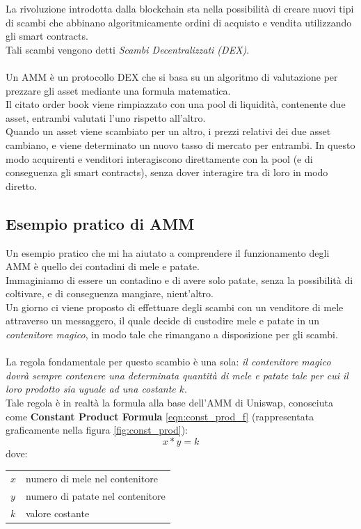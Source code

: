 \documentclass[12pt,a4paper]{report}
\makeatletter
\newenvironment{conditions}
  {\par\vspace{\abovedisplayskip}\noindent\begin{tabular}{>{$}l<{$} @{${}={}$} l}}
  {\end{tabular}\par\vspace{\belowdisplayskip}}
\makeatother
\begin{document}
La rivoluzione introdotta dalla blockchain sta nella possibilità di creare nuovi tipi di scambi che abbinano algoritmicamente ordini di acquisto e vendita utilizzando gli smart contracts.
\\Tali scambi vengono detti \textit{Scambi Decentralizzati (DEX)}.
\\\\Un AMM è un protocollo DEX che si basa su un algoritmo di valutazione per prezzare gli asset mediante una formula matematica.
\\Il citato order book viene rimpiazzato con una pool di liquidità\cite{liquidity_pool}, contenente due asset, entrambi valutati l'uno rispetto all'altro.
\\Quando un asset viene scambiato per un altro, i prezzi relativi dei due asset cambiano, e viene determinato un nuovo tasso di mercato per entrambi.
In questo modo acquirenti e venditori interagiscono direttamente con la pool (e di conseguenza gli smart contracts), senza dover interagire tra di loro in modo diretto.

\subsection{Esempio pratico di AMM}

Un esempio pratico che mi ha aiutato a comprendere il funzionamento degli AMM è quello dei contadini di mele e patate.
\\Immaginiamo di essere un contadino e di avere solo patate, senza la possibilità di coltivare, e di conseguenza mangiare, nient'altro.\\ Un giorno ci viene proposto di effettuare degli scambi con un venditore di mele attraverso un messaggero, il quale decide di custodire mele e patate in un \textit{contenitore magico}, in modo tale che rimangano a disposizione per gli scambi.
\\\\La regola fondamentale per questo scambio è una sola: \textit{il contenitore magico dovrà sempre contenere una determinata quantità di mele e patate tale per cui il loro prodotto sia uguale ad una costante $k$}.
\\Tale regola è in realtà la formula alla base dell'AMM di Uniswap, conosciuta come \textbf{Constant Product Formula} \ref{eqn:const_prod_f} (rappresentata graficamente nella figura \ref{fig:const_prod}): \\

\begin{equation}
x * y = k
\label{eqn:const_prod_f}
\end{equation}
dove:
\begin{conditions}
 x & numero di mele nel contenitore \\
 y & numero di patate nel contenitore \\  
 k & valore costante \\
\end{conditions}
\end{document}
